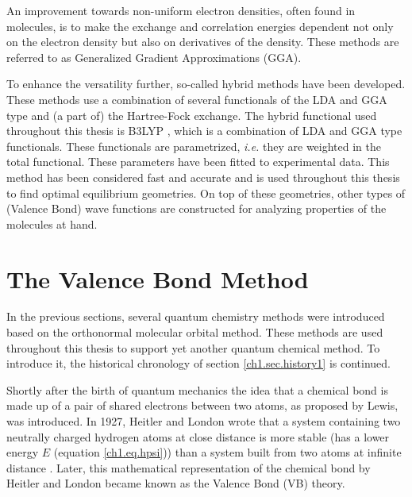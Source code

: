 An improvement towards non-uniform electron densities, often found in molecules, is to make the exchange and correlation energies dependent not only on the electron density but also on derivatives of the density. These methods are referred to as Generalized Gradient Approximations (GGA).

To enhance the versatility further, so-called hybrid methods have been developed. These methods use a combination of several functionals of the LDA and GGA type and (a part of) the Hartree-Fock exchange. The hybrid functional used throughout this thesis is B3LYP \cite{b3lyp1,b3lyp2,b3lyp3}, which is a combination of LDA and GGA type functionals. These functionals are parametrized, \textit{i.e.} they are weighted in the total functional. These parameters have been fitted to experimental data. This method has been considered fast and accurate and is used throughout this thesis to find optimal equilibrium geometries. On top of these geometries, other types of (Valence Bond) wave functions are constructed for analyzing properties of the molecules at hand.

\section{The Valence Bond Method}

In the previous sections, several quantum chemistry methods were introduced based on the orthonormal molecular orbital method. These methods are used throughout this thesis to support yet another quantum chemical method. To introduce it, the historical chronology of section \ref{ch1.sec.history1} is continued.

Shortly after the birth of quantum mechanics the idea that a chemical bond is made up of a pair of shared electrons between two atoms, as proposed by Lewis, was introduced. In 1927, Heitler and London wrote that a system containing two neutrally charged hydrogen atoms at close distance is more stable (has a lower energy $E$ (equation \ref{ch1.eq.hpsi})) than a system built from two atoms at infinite distance \cite{heitler}. Later, this mathematical representation of the chemical bond by Heitler and London became known as the Valence Bond (VB) theory. 

